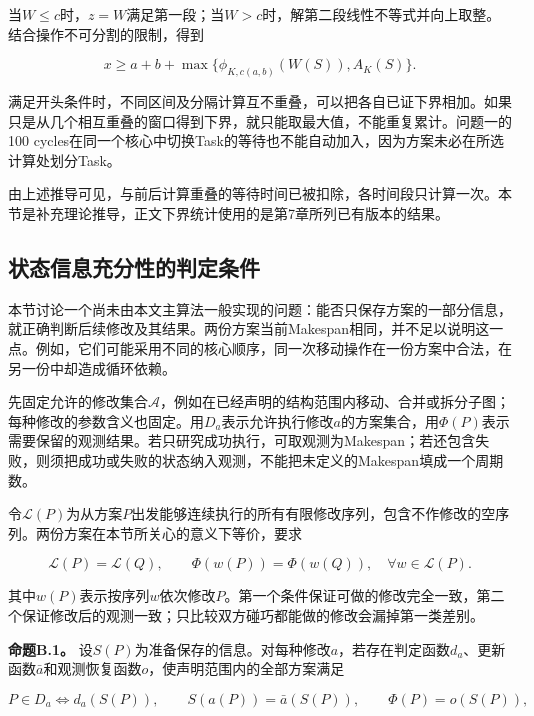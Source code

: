 \documentclass[anonymous,notoc]{gmcm2026}
\begin{document}
当\(W\le c\)时，\(z=W\)满足第一段；当\(W>c\)时，解第二段线性不等式并向上取整。结合操作不可分割的限制，得到

\begin{equation}
x\ge a+b+\max\{\phi_{K,c(a,b)}(W(S)),A_K(S)\}.
\end{equation}

满足开头条件时，不同区间及分隔计算互不重叠，可以把各自已证下界相加。如果只是从几个相互重叠的窗口得到下界，就只能取最大值，不能重复累计。问题一的100 cycles在同一个核心中切换Task的等待也不能自动加入，因为方案未必在所选计算处划分Task。

由上述推导可见，与前后计算重叠的等待时间已被扣除，各时间段只计算一次。本节是补充理论推导，正文下界统计使用的是第7章所列已有版本的结果。

\subsection{状态信息充分性的判定条件}

本节讨论一个尚未由本文主算法一般实现的问题：能否只保存方案的一部分信息，就正确判断后续修改及其结果。两份方案当前Makespan相同，并不足以说明这一点。例如，它们可能采用不同的核心顺序，同一次移动操作在一份方案中合法，在另一份中却造成循环依赖。

先固定允许的修改集合\(\mathcal A\)，例如在已经声明的结构范围内移动、合并或拆分子图；每种修改的参数含义也固定。用\(D_a\)表示允许执行修改\(a\)的方案集合，用\(\Phi(P)\)表示需要保留的观测结果。若只研究成功执行，可取观测为Makespan；若还包含失败，则须把成功或失败的状态纳入观测，不能把未定义的Makespan填成一个周期数。

令\(\mathcal L(P)\)为从方案\(P\)出发能够连续执行的所有有限修改序列，包含不作修改的空序列。两份方案在本节所关心的意义下等价，要求

\begin{equation}
\mathcal L(P)=\mathcal L(Q),\qquad \Phi(w(P))=\Phi(w(Q)),\quad\forall w\in\mathcal L(P).
\end{equation}

其中\(w(P)\)表示按序列\(w\)依次修改\(P\)。第一个条件保证可做的修改完全一致，第二个保证修改后的观测一致；只比较双方碰巧都能做的修改会漏掉第一类差别。

\textbf{命题B.1。} 设\(S(P)\)为准备保存的信息。对每种修改\(a\)，若存在判定函数\(d_a\)、更新函数\(\bar a\)和观测恢复函数\(o\)，使声明范围内的全部方案满足

\begin{equation}
P\in D_a\iff d_a(S(P)),\qquad S(a(P))=\bar a(S(P)),\qquad\Phi(P)=o(S(P)),
\end{equation}
\end{document}
